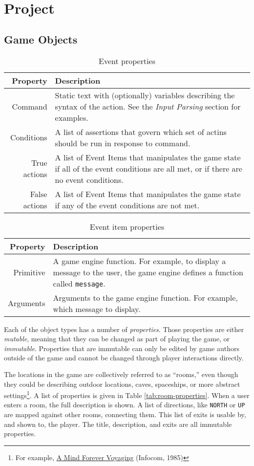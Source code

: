 \documentclass{article}
\newcommand{\enterProblemHeader}[1]{
}
\newcommand{\exitProblemHeader}[1]{
\nobreak\extramarks{#1}{}\nobreak
}
\newcounter{homeworkProblemCounter} %
\newcommand{\homeworkProblemName}{}
\newenvironment{homeworkProblem}[1][Problem \arabic{homeworkProblemCounter}]{ %
\stepcounter{homeworkProblemCounter} %
\renewcommand{\homeworkProblemName}{#1} %
\section{\homeworkProblemName} %
\enterProblemHeader{\homeworkProblemName} %
}{
\exitProblemHeader{\homeworkProblemName} %
}
\newcommand{\homeworkSectionName}{}
\newenvironment{homeworkSection}[1]{ %
\renewcommand{\homeworkSectionName}{#1} %
\subsection{\homeworkSectionName} %
\enterProblemHeader{\homeworkProblemName\ [\homeworkSectionName]} %
}{
\enterProblemHeader{\homeworkProblemName} %
}
\begin{document}
\begin{homeworkProblem}[Project]
\begin{homeworkSection}{Game Objects}
\begin{table}
	\begin{tabularx}{\textwidth}{|r|X|}
		\hline
		Property & Description \\
		\hline \hline
		Command & Static text with (optionally) variables describing the syntax of the action. See the \textit{Input Parsing} section for examples. \\
		Conditions & A list of assertions that govern which set of actins should be run in response to command. \\
		True actions & A list of Event Items that manipulates the game state if all of the event conditions are all met, or if there are no event conditions. \\
		False actions & A list of Event Items that manipulates the game state if any of the event conditions are not met. \\
		\hline
	\end{tabularx}
	\caption{Event properties}
	\label{tab:event-properties}
\end{table}

\begin{table}
	\begin{tabularx}{\textwidth}{|r|X|}
		\hline
		Property & Description \\
		\hline \hline
		Primitive & A game engine function. For example, to display a message to the user, the game engine defines a function called \texttt{message}. \\
		Arguments & Arguments to the game engine function. For example, which message to display. \\
		\hline
	\end{tabularx}
	\caption{Event item properties}
	\label{tab:event-item-properties}
\end{table}

	Each of the object types has a number of \textit{properties}. Those properties are either \textit{mutable}, meaning that they can be changed as part of playing the game, or \textit{immutable}. Properties that are immutable can only be edited by game authors outside of the game and cannot be changed through player interactions directly.

	The locations in the game are collectively referred to as ``rooms,'' even though they could be describing outdoor locations, caves, spaceships, or more abstract settings\footnote{For example, \href{https://en.wikipedia.org/wiki/A_Mind_Forever_Voyaging}{A Mind Forever Voyaging} (Infocom, 1985)}. A list of properties is given in Table \ref{tab:room-properties}. When a user enters a room, the full description is shown. A list of directions, like \texttt{NORTH} or \texttt{UP} are mapped against other rooms, connecting them. This list of exits is usable by, and shown to, the player. The title, description, and exits are all immutable properties.


\end{homeworkSection}
\end{homeworkProblem}
\end{document}

